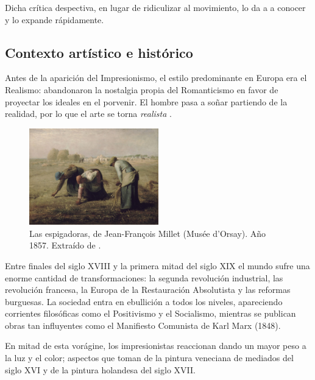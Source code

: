 \documentclass[../main.tex]{subfiles}
\begin{document}
Dicha crítica despectiva, en lugar de ridiculizar al movimiento, lo da a a conocer y lo expande rápidamente.

\subsection{Contexto artístico e histórico}

Antes de la aparición del Impresionismo, el estilo predominante en Europa era el Realismo: abandonaron la nostalgia propia del Romanticismo en favor de proyectar los ideales en el porvenir. El hombre pasa a soñar partiendo de la realidad, por lo que el arte se torna \textit{realista} \cite{EditorialSalvat2006}.

\begin{figure}[h!]
    \centering
    \includegraphics[width=0.5\textwidth]{imagenes/Las espigadoras.jpg}
    \caption[Las espigadoras, de Jean-François Millet]{Las espigadoras, de Jean-François Millet (Musée d'Orsay). Año 1857. Extraído de \cite{Millet1857}.}
    \label{fig:millet_espigadoras}
\end{figure}

Entre finales del siglo XVIII y la primera mitad del siglo XIX el mundo sufre una enorme cantidad de transformaciones: la segunda revolución industrial, las revolución francesa, la Europa de la Restauración Absolutista y las reformas burguesas. La sociedad entra en ebullición a todos los niveles, apareciendo corrientes filosóficas como el Positivismo y el Socialismo, mientras se publican obras tan influyentes como el Manifiesto Comunista de Karl Marx (1848).
\newline

En mitad de esta vorágine, los impresionistas reaccionan dando un mayor peso a la luz y el color; aspectos que toman de la pintura veneciana de mediados del siglo XVI y de la pintura holandesa del siglo XVII.
\end{document}
